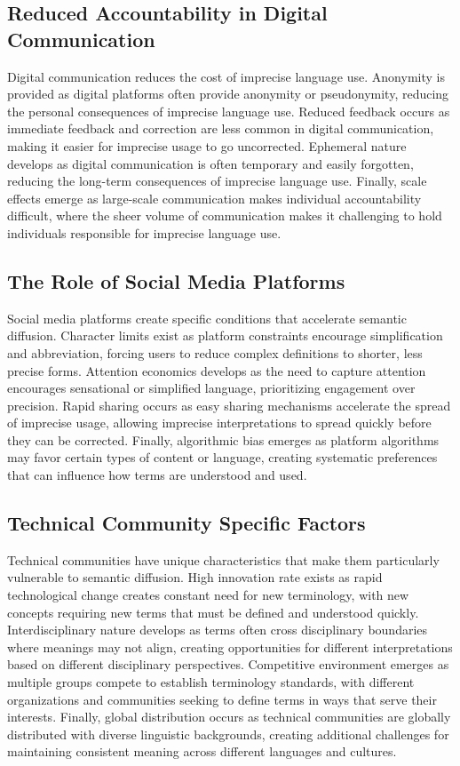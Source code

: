 \documentclass[11pt]{article}
\begin{document}
\subsection{Reduced Accountability in Digital Communication}

Digital communication reduces the cost of imprecise language use. Anonymity is provided as digital platforms often provide anonymity or pseudonymity, reducing the personal consequences of imprecise language use. Reduced feedback occurs as immediate feedback and correction are less common in digital communication, making it easier for imprecise usage to go uncorrected. Ephemeral nature develops as digital communication is often temporary and easily forgotten, reducing the long-term consequences of imprecise language use. Finally, scale effects emerge as large-scale communication makes individual accountability difficult, where the sheer volume of communication makes it challenging to hold individuals responsible for imprecise language use.

\subsection{The Role of Social Media Platforms}

Social media platforms create specific conditions that accelerate semantic diffusion. Character limits exist as platform constraints encourage simplification and abbreviation, forcing users to reduce complex definitions to shorter, less precise forms. Attention economics develops as the need to capture attention encourages sensational or simplified language, prioritizing engagement over precision. Rapid sharing occurs as easy sharing mechanisms accelerate the spread of imprecise usage, allowing imprecise interpretations to spread quickly before they can be corrected. Finally, algorithmic bias emerges as platform algorithms may favor certain types of content or language, creating systematic preferences that can influence how terms are understood and used.

\subsection{Technical Community Specific Factors}

Technical communities have unique characteristics that make them particularly vulnerable to semantic diffusion. High innovation rate exists as rapid technological change creates constant need for new terminology, with new concepts requiring new terms that must be defined and understood quickly. Interdisciplinary nature develops as terms often cross disciplinary boundaries where meanings may not align, creating opportunities for different interpretations based on different disciplinary perspectives. Competitive environment emerges as multiple groups compete to establish terminology standards, with different organizations and communities seeking to define terms in ways that serve their interests. Finally, global distribution occurs as technical communities are globally distributed with diverse linguistic backgrounds, creating additional challenges for maintaining consistent meaning across different languages and cultures.
\end{document}
